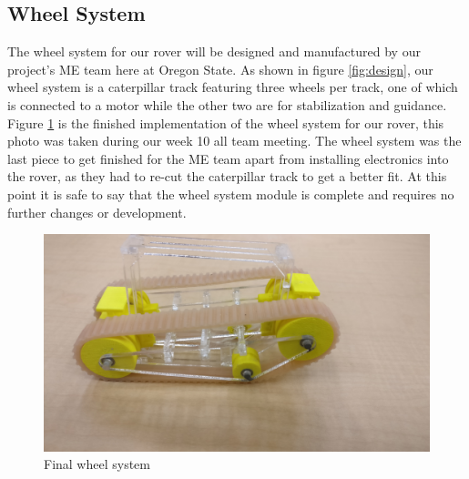 \documentclass[10pt,letterpaper,onecolumn,draftclsnofoot,journal]{IEEEtran}
\begin{document}
\subsection{Wheel System}
The wheel system for our rover will be designed and manufactured by our project's ME team here at Oregon State. As shown in figure \ref{fig:design}, our wheel system is a caterpillar track featuring three wheels per track, one of which is connected to a motor while the other two are for stabilization and guidance. Figure \ref{fig:rover} is the finished implementation of the wheel system for our rover, this photo was taken during our week 10 all team meeting. The wheel system was the last piece to get finished for the ME team apart from installing electronics into the rover, as they had to re-cut the caterpillar track to get a better fit. At this point it is safe to say that the wheel system module is complete and requires no further changes or development.

\begin{figure}[H]
	\centering
	\includegraphics[scale = .05]{builtrover.jpg}
	\caption{Final wheel system}
	\label{fig:rover}
\end{figure}
\end{document}
